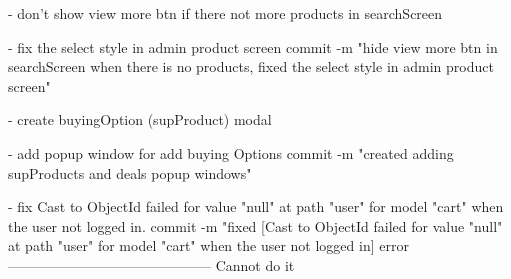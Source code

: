 -   don't show view more btn if there not more products in searchScreen

-   fix the select style in admin product screen
      commit -m "hide view more btn in searchScreen when there is no products, fixed the select style in admin product screen"

-   create buyingOption (supProduct) modal 

-   add popup window for add buying Options
      commit -m "created adding supProducts and deals popup windows" 

-   fix Cast to ObjectId failed for value "null" at path "user" for model "cart" when the user not logged in.
      commit -m "fixed [Cast to ObjectId failed for value "null" at path "user" for model "cart" when the user not logged in] error
--------------------------------------------
Cannot do it
